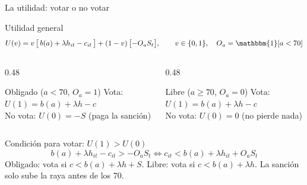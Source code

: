 \documentclass[aspectratio=169,11pt,xcolor=table]{beamer}
\newcommand{\1}{\mathbbm{1}}
\begin{document}
\begin{frame}{La utilidad: votar o no votar}
  \begin{block}{Utilidad general}
    \[ U(v)=v\,\bigl[\,b(a)+\lambda h_{it}-c_{it}\,\bigr]+(1-v)\,\bigl[-O_a S_t\bigr],\qquad v\in\{0,1\},\quad O_a=\1[a<70] \]
  \end{block}
  \begin{columns}[T]
    \begin{column}{0.48\textwidth}
      \begin{block}{Obligado ($a<70$, $O_a=1$)}
        \small Vota: \;$U(1)=b(a)+\lambda h-c$\\
        No vota: \;$U(0)=-S$ \;(paga la sanción)
      \end{block}
    \end{column}
    \begin{column}{0.48\textwidth}
      \begin{block}{Libre ($a\ge70$, $O_a=0$)}
        \small Vota: \;$U(1)=b(a)+\lambda h-c$\\
        No vota: \;$U(0)=0$ \;(no pierde nada)
      \end{block}
    \end{column}
  \end{columns}
  \vspace{0.15cm}
  \begin{block}{Condición para votar: $U(1)>U(0)$}
    \[ b(a)+\lambda h_{it}-c_{it}>-O_aS_t\iff c_{it}<b(a)+\lambda h_{it}+O_aS_t \]
    \small Obligado: vota si $c<b(a)+\lambda h+S$. \quad Libre: vota si $c<b(a)+\lambda h$. La sanción solo sube la raya antes de los 70.
  \end{block}
\end{frame}
\end{document}
